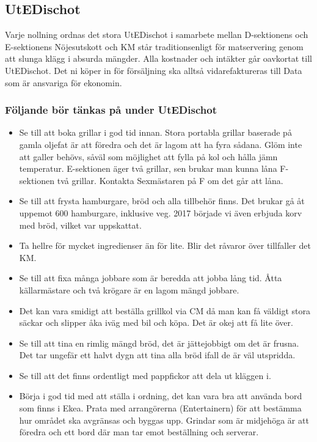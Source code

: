 \documentclass[10pt]{article}
\begin{document}
\subsection{UtEDischot}
Varje nollning ordnas det stora UtEDischot i samarbete mellan D-sektionens och E-sektionens Nöjesutskott och KM står traditionsenligt för matservering genom att slunga klägg i absurda mängder. Alla kostnader och intäkter går oavkortat till UtEDischot. Det ni köper in för försäljning ska alltså vidarefaktureras till Data som är ansvariga för ekonomin.
\subsubsection*{Följande bör tänkas på under UtEDischot}
\begin{itemize}
	\item Se till att boka grillar i god tid innan. Stora portabla grillar baserade på
gamla oljefat är att föredra och det är lagom att ha fyra sådana. Glöm inte att
galler behövs, såväl som möjlighet att fylla på kol och hålla jämn temperatur. E-sektionen äger två grillar, sen brukar man kunna låna F-sektionen två grillar. Kontakta Sexmästaren på F om det går att låna.
	\item Se till att frysta hamburgare, bröd och alla tillbehör finns. Det brukar gå åt uppemot 600 hamburgare, inklusive veg. 2017 började vi även erbjuda korv med bröd, vilket var uppskattat.
    \item Ta hellre för mycket ingredienser än för lite. Blir det råvaror över tillfaller det KM.
    \item Se till att fixa många jobbare som är beredda att jobba lång tid. Åtta källarmästare och två krögare är en lagom mängd jobbare.
    \item Det kan vara smidigt att beställa grillkol via CM då man kan få
väldigt stora säckar och slipper åka iväg med bil och köpa. Det är okej att få lite
över.
	\item Se till att tina en rimlig mängd bröd, det är jättejobbigt om det är frusna. Det tar ungefär ett halvt dygn att tina alla bröd ifall de är väl utspridda.
    \item Se till att det finns ordentligt med pappfickor att dela ut kläggen i.
    \item Börja i god tid med att ställa i ordning, det kan vara bra att använda bord som
finns i Ekea. Prata med arrangörerna (Entertainern) för att bestämma hur området ska avgränsas och byggas upp. Grindar som är midjehöga är att föredra
och ett bord där man tar emot beställning och serverar.

\end{itemize}
\end{document}
